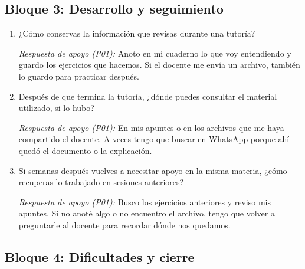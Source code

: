 \documentclass[11pt,a4paper]{article}
\begin{document}
\subsection{Bloque 3: Desarrollo y seguimiento}

\begin{enumerate}[resume,label=\textbf{\arabic*.}]
    \item ¿Cómo conservas la información que revisas durante
    una tutoría?

    \textit{Respuesta de apoyo (P01):} Anoto en mi cuaderno lo que voy entendiendo y guardo los ejercicios que hacemos. Si el docente me envía un archivo, también lo guardo para practicar después.

    \item Después de que termina la tutoría, ¿dónde puedes
    consultar el material utilizado, si lo hubo?

    \textit{Respuesta de apoyo (P01):} En mis apuntes o en los archivos que me haya compartido el docente. A veces tengo que buscar en WhatsApp porque ahí quedó el documento o la explicación.

    \item Si semanas después vuelves a necesitar apoyo en
    la misma materia, ¿cómo recuperas lo trabajado en
    sesiones anteriores?

    \textit{Respuesta de apoyo (P01):} Busco los ejercicios anteriores y reviso mis apuntes. Si no anoté algo o no encuentro el archivo, tengo que volver a preguntarle al docente para recordar dónde nos quedamos.
\end{enumerate}

\subsection{Bloque 4: Dificultades y cierre}
\end{document}
